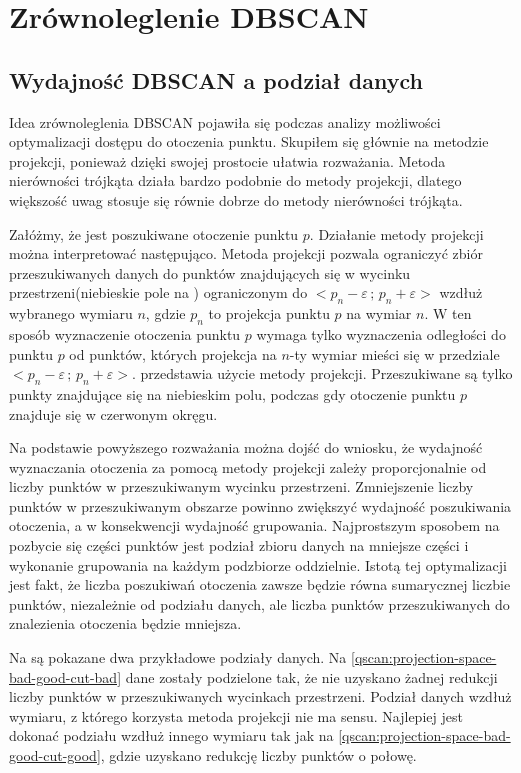 \section{Zrównoleglenie DBSCAN}
\subsection{Wydajność DBSCAN a podział danych}
Idea zrównoleglenia DBSCAN pojawiła się podczas analizy możliwości optymalizacji dostępu do otoczenia punktu. Skupiłem się głównie na metodzie projekcji, ponieważ dzięki swojej prostocie ułatwia rozważania. Metoda nierówności trójkąta działa bardzo podobnie do metody projekcji, dlatego większość uwag stosuje się równie dobrze do metody nierówności trójkąta.\par
Załóżmy, że jest poszukiwane otoczenie punktu $ p $. Działanie metody projekcji można interpretować następująco. Metoda projekcji pozwala ograniczyć zbiór przeszukiwanych danych do punktów znajdujących się w wycinku przestrzeni(niebieskie pole na ) ograniczonym do $ <p_n-\varepsilon\,;\,p_n+\varepsilon> $ wzdłuż wybranego wymiaru $ n $, gdzie $ p_n $ to projekcja punktu $ p $ na wymiar $ n $. W ten sposób wyznaczenie otoczenia punktu $ p $ wymaga tylko wyznaczenia odległości do punktu $ p $ od punktów, których projekcja na $ n $-ty wymiar mieści się w przedziale $ <p_n-\varepsilon\,;\,p_n+\varepsilon> $.  przedstawia użycie metody projekcji. Przeszukiwane są tylko punkty znajdujące się na niebieskim polu, podczas gdy otoczenie punktu $ p $ znajduje się w czerwonym okręgu.\par

Na podstawie powyższego rozważania można dojść do wniosku, że wydajność wyznaczania otoczenia za pomocą metody projekcji zależy proporcjonalnie od liczby punktów w przeszukiwanym wycinku przestrzeni. Zmniejszenie liczby punktów w przeszukiwanym obszarze powinno zwiększyć wydajność poszukiwania otoczenia, a w konsekwencji wydajność grupowania. Najprostszym sposobem na pozbycie się części punktów jest podział zbioru danych na mniejsze części i wykonanie grupowania na każdym podzbiorze oddzielnie. Istotą tej optymalizacji jest fakt, że liczba poszukiwań otoczenia zawsze będzie równa sumarycznej liczbie punktów, niezależnie od podziału danych, ale liczba punktów przeszukiwanych do znalezienia otoczenia będzie mniejsza.\par

Na  są pokazane dwa przykładowe podziały danych. Na \ref{qscan:projection-space-bad-good-cut-bad} dane zostały podzielone tak, że nie uzyskano żadnej redukcji liczby punktów w przeszukiwanych wycinkach przestrzeni. Podział danych wzdłuż wymiaru, z którego korzysta metoda projekcji nie ma sensu. Najlepiej jest dokonać podziału wzdłuż innego wymiaru tak jak na \ref{qscan:projection-space-bad-good-cut-good}, gdzie uzyskano redukcję liczby punktów o połowę.\par
